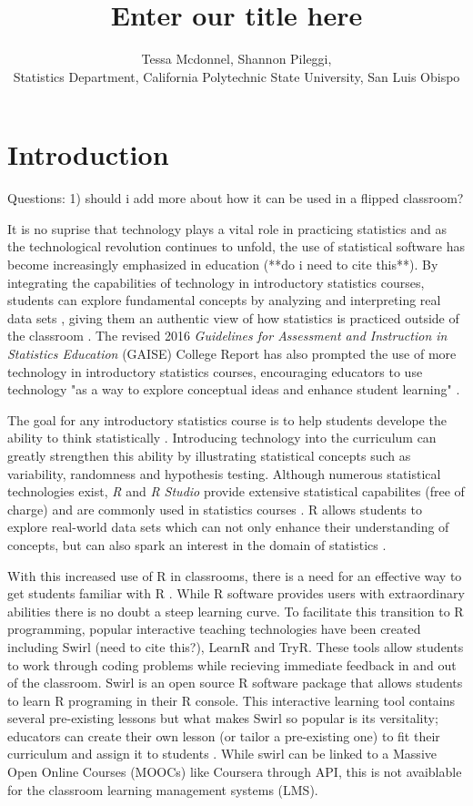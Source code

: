 \documentclass[12pt]{article}
\title{Enter our title here}
\author{Tessa Mcdonnel, Shannon Pileggi,  \\Statistics Department, California Polytechnic State University, San Luis Obispo}
\begin{document}
\maketitle

\section{Introduction}

Questions: 
1) should i add more about how it can be used in a flipped classroom?

It is no suprise that technology plays a vital role in practicing statistics and as the technological revolution continues to
unfold, the use of statistical software has become increasingly emphasized in education (**do i need to cite this**). By integrating the
capabilities of technology in introductory statistics courses, students can explore fundamental concepts by analyzing and
interpreting real data sets \cite{Chance2007, Hardin2015, Horton2014}, giving them an authentic view of how statistics is practiced outside of the
classroom \cite{Wang2017}. The revised 2016 \textit{Guidelines for Assessment and Instruction in Statistics Education}
(GAISE) College Report has also prompted the use of more technology in introductory statistics courses, encouraging educators
to use technology "as a way to explore conceptual ideas and enhance student learning" \cite{AmericanStatisticalAssociation2016}.

The goal for any introductory statistics course is to help students develope the ability to think statistically
\cite{AmericanStatisticalAssociation2016}.
Introducing technology into the curriculum can greatly strengthen this ability by illustrating statistical concepts such as
variability, randomness and hypothesis testing. Although numerous statistical technologies exist, \textit{R} and \textit{R Studio}
provide extensive statistical capabilites (free of charge) and are commonly used in statistics courses \cite{Chance2007}. R
allows students to explore real-world data sets which can not only enhance their understanding of concepts, but can also spark
an interest in the domain of statistics \cite{Wang2017}.

With this increased use of R in classrooms, there is a need for an effective way to get students familiar with R \cite{Baumer2014}. While R
software provides users with extraordinary abilities there is no doubt a steep learning curve. To facilitate this transition
to R programming, popular interactive teaching technologies have been created including Swirl (need to cite this?), LearnR
and TryR. These tools
allow students to work through coding problems while recieving immediate feedback in and out of the classroom. Swirl is an
open source R software package that allows students to learn R programing in their R console. This interactive learning tool
contains several pre-existing lessons but what makes Swirl so popular is its versitality; educators can create their own
lesson (or tailor a pre-existing one) to fit their curriculum and assign it to students \cite{Carchedi2014}.
While swirl can be linked to a Massive Open Online Courses (MOOCs) like Coursera through API, this is not avaiblable for the classroom
learning management systems (LMS).
\end{document}
